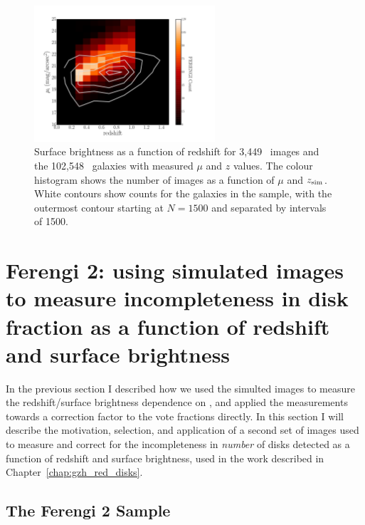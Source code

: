 \begin{figure}
\begin{center}
\includegraphics[width=0.6\textwidth]{figures/eye_of_sauron.pdf}
\caption{Surface brightness as a function of redshift for 3,449~\ferengi{}
images and the 102,548~\main{} galaxies with measured $\mu$ and $z$ values. The
colour histogram shows the number of \ferengi{} images as a function of $\mu$
and $z_{\rm sim}$. White contours show counts for the galaxies in the \main{}
sample, with the outermost contour starting at $N=1500$ and separated by
intervals of 1500.} 
\label{fig:eye_of_sauron}
\end{center}
\end{figure}

\section{Ferengi 2: using simulated images to measure incompleteness in disk fraction as a function of redshift and surface brightness}

In the previous section I described how we used the simulted \ferengi{} images to measure the redshift/surface brightness dependence on \ffeatures, and applied the measurements towards a correction factor to the vote fractions directly. In this section I will describe the motivation, selection, and application of a second set of \ferengi{} images used to measure and correct for the incompleteness in \emph{number} of disks detected as a function of redshift and surface brightness, used in the work described in Chapter~\ref{chap:gzh_red_disks}.

\subsection{The Ferengi 2 Sample}

